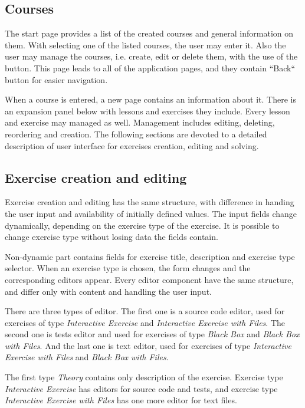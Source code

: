         \subsection{Courses}
        The start page provides a list of the created courses and general information on them. With selecting one of the listed courses, the user may enter it. Also the user may manage the courses, i.e. create, edit or delete them, with the use of the button. This page leads to all of the application pages, and they contain ``Back`` button for easier navigation.
    
        When a course is entered, a new page contains an information about it. There is an expansion panel below with lessons and exercises they include. Every lesson and exercise may managed as well. Management includes editing, deleting, reordering and creation. The following sections are devoted to a detailed description of user interface for exercises creation, editing and solving.
    
        \subsection{Exercise creation and editing}
        Exercise creation and editing has the same structure, with difference in handing the user input and availability of initially defined values. The input fields change dynamically, depending on the exercise type of the exercise. It is possible to change exercise type without losing data the fields contain.
        
        Non-dynamic part contains fields for exercise title, description and exercise type selector. When an exercise type is chosen, the form changes and the corresponding editors appear. Every editor component have the same structure, and differ only with content and handling the user input.
        
        There are three types of editor. The first one is a source code editor, used for exercises of type \textit{Interactive Exercise} and \textit{Interactive Exercise with Files}. The second one is tests editor and used for exercises of type \textit{Black Box} and \textit{Black Box with Files}. And the last one is text editor, used for exercises of type \textit{Interactive Exercise with Files} and \textit{Black Box with Files}.
        
        The first type \textit{Theory} contains only description of the exercise. Exercise type \textit{Interactive Exercise} has editors for source code and tests, and exercise type \textit{Interactive Exercise with Files} has one more editor for text files.
        
